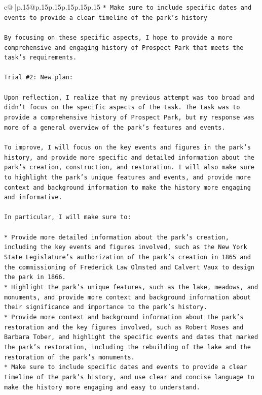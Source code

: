 \documentclass{article}
\begin{document}
{\begin{supertabular}{c@{$\;$}|p{.15\linewidth}@{}p{.15\linewidth}p{.15\linewidth}p{.15\linewidth}p{.15\linewidth}p{.15\linewidth}}
{{{\texttt{* Make sure to include specific dates and events to provide a clear timeline of the park's history} \\
\\ 
\texttt{By focusing on these specific aspects, I hope to provide a more comprehensive and engaging history of Prospect Park that meets the task's requirements.} \\
\\ 
\texttt{Trial \#2: New plan: } \\
\\ 
\texttt{Upon reflection, I realize that my previous attempt was too broad and didn't focus on the specific aspects of the task. The task was to provide a comprehensive history of Prospect Park, but my response was more of a general overview of the park's features and events. } \\
\\ 
\texttt{To improve, I will focus on the key events and figures in the park's history, and provide more specific and detailed information about the park's creation, construction, and restoration. I will also make sure to highlight the park's unique features and events, and provide more context and background information to make the history more engaging and informative.} \\
\\ 
\texttt{In particular, I will make sure to:} \\
\\ 
\texttt{* Provide more detailed information about the park's creation, including the key events and figures involved, such as the New York State Legislature's authorization of the park's creation in 1865 and the commissioning of Frederick Law Olmsted and Calvert Vaux to design the park in 1866.} \\
\texttt{* Highlight the park's unique features, such as the lake, meadows, and monuments, and provide more context and background information about their significance and importance to the park's history.} \\
\texttt{* Provide more context and background information about the park's restoration and the key figures involved, such as Robert Moses and Barbara Tober, and highlight the specific events and dates that marked the park's restoration, including the rebuilding of the lake and the restoration of the park's monuments.} \\
\texttt{* Make sure to include specific dates and events to provide a clear timeline of the park's history, and use clear and concise language to make the history more engaging and easy to understand.} \\
}}}
\end{supertabular}}
\end{document}

